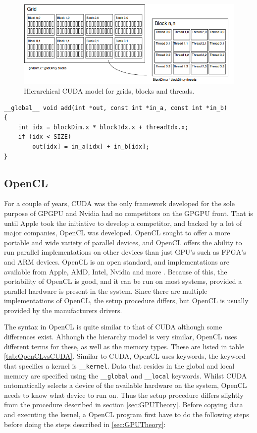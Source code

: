 \begin{figure}[!htpb]
    \centering
    \includegraphics[width=\textwidth]{Theory/Figs/CUDAGridBlockThreads.png}
    \caption{Hierarchical CUDA model for grids, blocks and threads.}
    \label{fig:CUDAGridBlockThreads}
\end{figure}

\begin{lstlisting}[caption={CUDA vector addition kernel}, label={lst:cudaVectorAdd}, frame=single] 
__global__ void add(int *out, const int *in_a, const int *in_b)
{
	int idx = blockDim.x * blockIdx.x + threadIdx.x;
	if (idx < SIZE)
		out[idx] = in_a[idx] + in_b[idx];
}
\end{lstlisting}



\subsection{OpenCL} \label{sec:OpenCLTheory}
For a couple of years, CUDA was the only framework developed for the sole purpose of GPGPU and Nvidia had no competitors on the GPGPU front. That is until Apple took the initiative to develop a competitor, and backed by a lot of major companies, OpenCL was developed. OpenCL sought to offer a more portable and wide variety of parallel devices, and OpenCL offers the ability to run parallel implementations on other devices than just GPU's such as FPGA's and ARM devices. OpenCL is an open standard, and implementations are available from Apple, AMD, Intel, Nvidia and more \cite{KhronosOpenCL}. Because of this, the portability of OpenCL is good, and it can be run on most systems, provided a parallel hardware is present in the system. Since there are multiple implementations of OpenCL, the setup procedure differs, but OpenCL is usually provided by the manufacturers drivers.

The syntax in OpenCL is quite similar to that of CUDA although some differences exist. Although the hierarchy model is very similar, OpenCL uses different terms for these, as well as the memory types. These are listed in table \ref{tab:OpenCLvsCUDA}. Similar to CUDA, OpenCL uses keywords, the keyword that specifies a kernel is \lstinline{__kernel}. Data that resides in the global and local memory are specified using the \lstinline{__global} and \lstinline{__local} keywords.
Whilst CUDA automatically selects a device of the available hardware on the system, OpenCL needs to know what device to run on. Thus the setup procedure differs slightly from the procedure described in section \ref{sec:GPUTheory}. Before copying data and executing the kernel, a OpenCL program first have to do the following steps before doing the steps described in \ref{sec:GPUTheory}:

